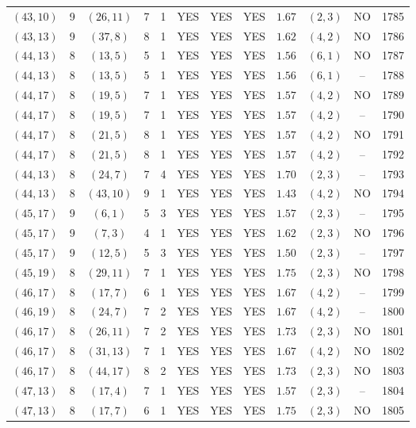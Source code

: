 \begin{longtable}{|c|c|c|c|c|c|c|c|c|c|c|c|}
$(43,10)$ & 9 & $(26,11)$ & 7 & 1 & YES & YES & YES & $1.67$ & $(2,3)$ & NO & 1785\\
$(43,13)$ & 9 & $(37,8)$ & 8 & 1 & YES & YES & YES & $1.62$ & $(4,2)$ & NO & 1786\\
$(44,13)$ & 8 & $(13,5)$ & 5 & 1 & YES & YES & YES & $1.56$ & $(6,1)$ & NO & 1787\\
$(44,13)$ & 8 & $(13,5)$ & 5 & 1 & YES & YES & YES & $1.56$ & $(6,1)$ & -- & 1788\\
$(44,17)$ & 8 & $(19,5)$ & 7 & 1 & YES & YES & YES & $1.57$ & $(4,2)$ & NO & 1789\\
$(44,17)$ & 8 & $(19,5)$ & 7 & 1 & YES & YES & YES & $1.57$ & $(4,2)$ & -- & 1790\\
$(44,17)$ & 8 & $(21,5)$ & 8 & 1 & YES & YES & YES & $1.57$ & $(4,2)$ & NO & 1791\\
$(44,17)$ & 8 & $(21,5)$ & 8 & 1 & YES & YES & YES & $1.57$ & $(4,2)$ & -- & 1792\\
$(44,13)$ & 8 & $(24,7)$ & 7 & 4 & YES & YES & YES & $1.70$ & $(2,3)$ & -- & 1793\\
$(44,13)$ & 8 & $(43,10)$ & 9 & 1 & YES & YES & YES & $1.43$ & $(4,2)$ & NO & 1794\\
$(45,17)$ & 9 & $(6,1)$ & 5 & 3 & YES & YES & YES & $1.57$ & $(2,3)$ & -- & 1795\\
$(45,17)$ & 9 & $(7,3)$ & 4 & 1 & YES & YES & YES & $1.62$ & $(2,3)$ & NO & 1796\\
$(45,17)$ & 9 & $(12,5)$ & 5 & 3 & YES & YES & YES & $1.50$ & $(2,3)$ & -- & 1797\\
$(45,19)$ & 8 & $(29,11)$ & 7 & 1 & YES & YES & YES & $1.75$ & $(2,3)$ & NO & 1798\\
$(46,17)$ & 8 & $(17,7)$ & 6 & 1 & YES & YES & YES & $1.67$ & $(4,2)$ & -- & 1799\\
$(46,19)$ & 8 & $(24,7)$ & 7 & 2 & YES & YES & YES & $1.67$ & $(4,2)$ & -- & 1800\\
$(46,17)$ & 8 & $(26,11)$ & 7 & 2 & YES & YES & YES & $1.73$ & $(2,3)$ & NO & 1801\\
$(46,17)$ & 8 & $(31,13)$ & 7 & 1 & YES & YES & YES & $1.67$ & $(4,2)$ & NO & 1802\\
$(46,17)$ & 8 & $(44,17)$ & 8 & 2 & YES & YES & YES & $1.73$ & $(2,3)$ & NO & 1803\\
$(47,13)$ & 8 & $(17,4)$ & 7 & 1 & YES & YES & YES & $1.57$ & $(2,3)$ & -- & 1804\\
$(47,13)$ & 8 & $(17,7)$ & 6 & 1 & YES & YES & YES & $1.75$ & $(2,3)$ & NO & 1805\\

\end{longtable}
